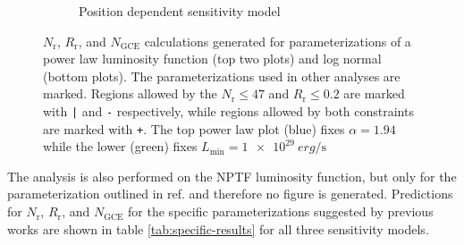 \documentclass[a4paper,11pt]{article}
\begin{document}
\begin{figure}
\begin{subfigure}[b]{0.49\textwidth}
        \caption{Position dependent sensitivity model}
        \label{fig:position-dependent}
    \end{subfigure}
    \caption{$N_\text{r}$, $R_\text{r}$, and $N_\text{GCE}$ calculations generated for parameterizations of a power law luminosity function (top two plots) and log normal (bottom plots). The parameterizations used in other analyses are marked. Regions allowed by the $N_\text{r} \leq 47$ and $R_\text{r} \leq 0.2$ are marked with \texttt{|} and \texttt{-} respectively, while regions allowed by both constraints are marked with \texttt{+}. The top power law plot (blue) fixes $\alpha=1.94$ while the lower (green) fixes $L_\text{min}=\SI{1e29}{erg\per\second}$}
    \label{fig:step-and-pos}
\end{figure}

The analysis is also performed on the NPTF luminosity function, but only for the parameterization outlined in ref. \cite{Lee:2015fea} and therefore no figure is generated. Predictions for $N_\text{r}$, $R_\text{r}$, and $N_\text{GCE}$ for the specific parameterizations suggested by previous works are shown in table \ref{tab:specific-results} for all three sensitivity models.
\end{document}

